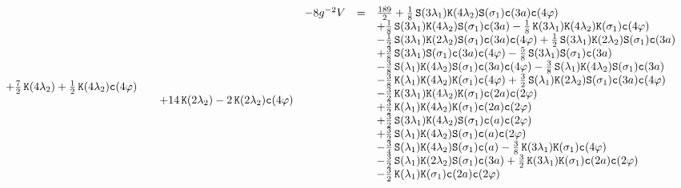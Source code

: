 \documentclass[a4paper,12pt]{article}
\begin{document}
\begin{equation}
{\begin{array}{lll}
+\frac{7}{2}\,\coshx{4 \lambda_2}
+\frac{1}{2}\,\coshx{4 \lambda_2} \cosx{4 \varphi}\\
&&+14\,\coshx{2 \lambda_2}
-2\,\coshx{2 \lambda_2} \cosx{4 \varphi}
\end{array}
}{
\begin{array}{lll}
-8g^{-2}V&=&
\frac{189}{2}
+\frac{1}{8}\,\sinhx{3 \lambda_1} \coshx{4 \lambda_2} \sinhx{ \sigma_1} \cosx{3 a} \cosx{4 \varphi}\\
&&+\frac{1}{8}\,\sinhx{3 \lambda_1} \coshx{4 \lambda_2} \sinhx{ \sigma_1} \cosx{3 a}
-\frac{1}{8}\,\coshx{3 \lambda_1} \coshx{4 \lambda_2} \coshx{ \sigma_1} \cosx{4 \varphi}\\
&&-\frac{1}{2}\,\sinhx{3 \lambda_1} \coshx{2 \lambda_2} \sinhx{ \sigma_1} \cosx{3 a} \cosx{4 \varphi}
+\frac{1}{2}\,\sinhx{3 \lambda_1} \coshx{2 \lambda_2} \sinhx{ \sigma_1} \cosx{3 a}\\
&&+\frac{3}{8}\,\sinhx{3 \lambda_1} \sinhx{ \sigma_1} \cosx{3 a} \cosx{4 \varphi}
-\frac{5}{8}\,\sinhx{3 \lambda_1} \sinhx{ \sigma_1} \cosx{3 a}\\
&&-\frac{3}{8}\,\sinhx{ \lambda_1} \coshx{4 \lambda_2} \sinhx{ \sigma_1} \cosx{3 a} \cosx{4 \varphi}
-\frac{3}{8}\,\sinhx{ \lambda_1} \coshx{4 \lambda_2} \sinhx{ \sigma_1} \cosx{3 a}\\
&&-\frac{3}{8}\,\coshx{ \lambda_1} \coshx{4 \lambda_2} \coshx{ \sigma_1} \cosx{4 \varphi}
+\frac{3}{2}\,\sinhx{ \lambda_1} \coshx{2 \lambda_2} \sinhx{ \sigma_1} \cosx{3 a} \cosx{4 \varphi}\\
&&-\frac{3}{2}\,\coshx{3 \lambda_1} \coshx{4 \lambda_2} \coshx{ \sigma_1} \cosx{2 a} \cosx{2 \varphi}\\
&&+\frac{3}{2}\,\coshx{ \lambda_1} \coshx{4 \lambda_2} \coshx{ \sigma_1} \cosx{2 a} \cosx{2 \varphi}\\
&&+\frac{3}{2}\,\sinhx{3 \lambda_1} \coshx{4 \lambda_2} \sinhx{ \sigma_1} \cosx{a} \cosx{2 \varphi}\\
&&+\frac{3}{2}\,\sinhx{ \lambda_1} \coshx{4 \lambda_2} \sinhx{ \sigma_1} \cosx{a} \cosx{2 \varphi}\\
&&-\frac{3}{4}\,\sinhx{ \lambda_1} \coshx{4 \lambda_2} \sinhx{ \sigma_1} \cosx{a}
-\frac{3}{8}\,\coshx{3 \lambda_1} \coshx{ \sigma_1} \cosx{4 \varphi}\\
&&-\frac{3}{2}\,\sinhx{ \lambda_1} \coshx{2 \lambda_2} \sinhx{ \sigma_1} \cosx{3 a}
+\frac{3}{2}\,\coshx{3 \lambda_1} \coshx{ \sigma_1} \cosx{2 a} \cosx{2 \varphi}\\
&&-\frac{3}{2}\,\coshx{ \lambda_1} \coshx{ \sigma_1} \cosx{2 a} \cosx{2 \varphi}

\end{array}}
\end{equation}
\end{document}
